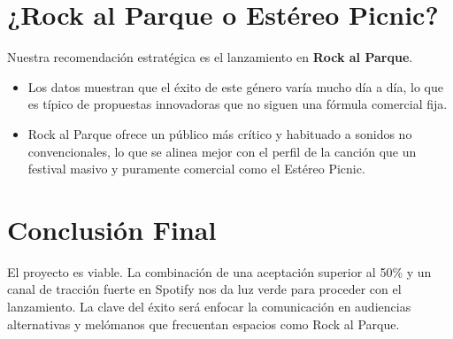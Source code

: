\documentclass[12pt]{article}
\begin{document}
\section{¿Rock al Parque o Estéreo Picnic?}
Nuestra recomendación estratégica es el lanzamiento en \textbf{Rock al Parque}. 
\begin{itemize}
    \item Los datos muestran que el éxito de este género varía mucho día a día, lo que es típico de propuestas innovadoras que no siguen una fórmula comercial fija.
    \item Rock al Parque ofrece un público más crítico y habituado a sonidos no convencionales, lo que se alinea mejor con el perfil de la canción que un festival masivo y puramente comercial como el Estéreo Picnic.
\end{itemize}

\section{Conclusión Final}
El proyecto es viable. La combinación de una aceptación superior al 50\% y un canal de tracción fuerte en Spotify nos da luz verde para proceder con el lanzamiento. La clave del éxito será enfocar la comunicación en audiencias alternativas y melómanos que frecuentan espacios como Rock al Parque.
\end{document}
